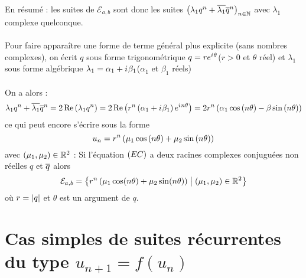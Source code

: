 \begin{dem}
\begin{itemize}
\begin{itemize}
        \end{itemize}
        En résumé : les suites de \(\mathcal{E}_{a,b}\) sont donc les suites \(\left(\lambda_1 q^n + \overline{\lambda_1}\overline{q}^n\right)_{n \in \mathbb{N}} \) avec \(\lambda_1\) complexe quelconque. \\~\\
        Pour faire apparaître une forme de terme général plus explicite (sans nombres complexes), on écrit \(q\) sous forme trigonométrique \(q = re^{i\mkern1mu \theta}\)(\(r>0\) et \(\theta\) réel) et \(\lambda_1\) sous forme algébrique \(\lambda_1 = \alpha_1 + i\mkern1mu \beta_1\)(\(\alpha_1\) et \(\beta_1\) réels)\\~\\
        On a alors : \[\lambda_1 q^n + \overline{\lambda_1}\overline{q}^n = 2\operatorname{Re}\left(\lambda_1q^n\right) = 2\operatorname{Re}\left(r^n\left(\alpha_1+i\mkern1mu \beta_1\right)e^{i\mkern1mu n \theta}\right) = 2r^n\left(\alpha_1\cos\left(n\theta\right)-\beta \sin\left(n\theta\right)\right)\]
        ce qui peut encore s'écrire sous la forme 
        \[u_n = r^n\left(\mu_1\cos\left(n\theta\right) + \mu_2\sin\left(n\theta\right)\right)\]
        avec \(\left(\mu_1,\mu_2\right) \in \mathbb{R}^2\)
        \conclusion : Si l'équation \(\left(EC\right)\) a deux racines complexes conjuguées non réelles \(q\) et \(\overline{q}\) alors 
        \[\mathcal{E}_{a,b} = \left\lbrace r^n\left(\mu_1\cos(n \theta)+\mu_2 \sin(n \theta)\right)\;\middle|\; \left(\mu_1,\mu_2\right)\in \mathbb{R}^2\right\rbrace\]
        où \(r= \left\lvert q\right\rvert\) et \(\theta\) est un argument de \(q\).
    \end{itemize}
\end{dem}

\section{Cas simples de suites récurrentes du type \(u_{n+1} = f (u_n)\)}

